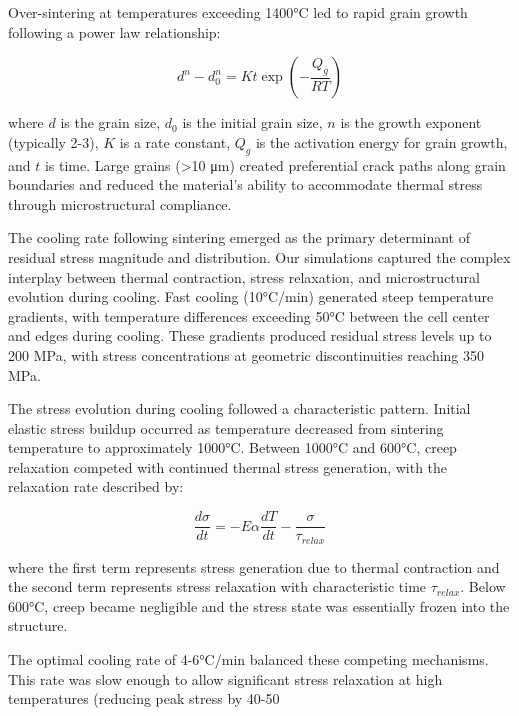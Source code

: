 \documentclass[conference]{IEEEtran}
\begin{document}
Over-sintering at temperatures exceeding 1400°C led to rapid grain growth following a power law relationship:

\begin{equation}
d^n - d_0^n = Kt \exp\left(-\frac{Q_g}{RT}\right)
\end{equation}

where $d$ is the grain size, $d_0$ is the initial grain size, $n$ is the growth exponent (typically 2-3), $K$ is a rate constant, $Q_g$ is the activation energy for grain growth, and $t$ is time. Large grains (>10 μm) created preferential crack paths along grain boundaries and reduced the material's ability to accommodate thermal stress through microstructural compliance.

The cooling rate following sintering emerged as the primary determinant of residual stress magnitude and distribution. Our simulations captured the complex interplay between thermal contraction, stress relaxation, and microstructural evolution during cooling. Fast cooling (10°C/min) generated steep temperature gradients, with temperature differences exceeding 50°C between the cell center and edges during cooling. These gradients produced residual stress levels up to 200 MPa, with stress concentrations at geometric discontinuities reaching 350 MPa.

The stress evolution during cooling followed a characteristic pattern. Initial elastic stress buildup occurred as temperature decreased from sintering temperature to approximately 1000°C. Between 1000°C and 600°C, creep relaxation competed with continued thermal stress generation, with the relaxation rate described by:

\begin{equation}
\frac{d\sigma}{dt} = -E\alpha\frac{dT}{dt} - \frac{\sigma}{\tau_{relax}}
\end{equation}

where the first term represents stress generation due to thermal contraction and the second term represents stress relaxation with characteristic time $\tau_{relax}$. Below 600°C, creep became negligible and the stress state was essentially frozen into the structure.

The optimal cooling rate of 4-6°C/min balanced these competing mechanisms. This rate was slow enough to allow significant stress relaxation at high temperatures (reducing peak stress by 40-50%
\end{document}
